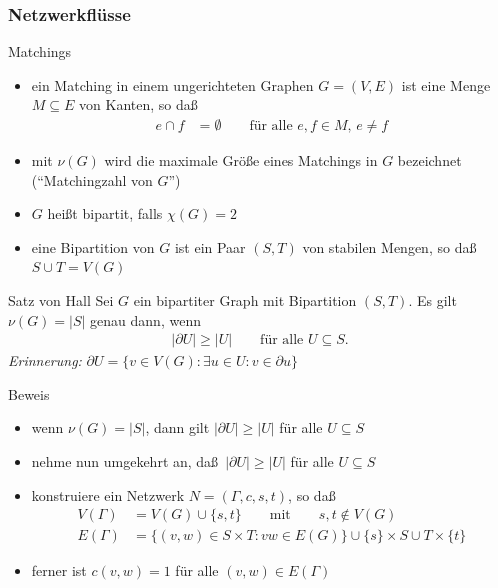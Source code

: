 \documentclass[aspectratio=1610, 11pt]{beamer}
\newcommand{\mytitle}{Netzwerkfl\"usse}
\begin{document}
\begin{frame}\frametitle{\mytitle}
	\begin{overprint}
		\begin{exampleblock}{Matchings}
			\begin{itemize}
				\item ein \alert{Matching} in einem ungerichteten Graphen $G=(V,E)$ ist eine Menge $M\subseteq E$ von Kanten, so da\ss
					\begin{align*}
						e\cap f&=\emptyset\qquad\mbox{f\"ur alle }e,f\in M,\,e\neq f
					\end{align*}
				\item mit $\nu(G)$ wird die maximale Gr\"o\ss e eines Matchings in $G$ bezeichnet (``Matchingzahl von $G$'')
				\item $G$ hei\ss t \alert{bipartit}, falls $\chi(G)=2$
				\item eine \alert{Bipartition} von $G$ ist ein Paar $(S,T)$ von stabilen Mengen, so da\ss\ $S\cup T=V(G)$
			\end{itemize}
		\end{exampleblock}
		\begin{exampleblock}{Satz von Hall}
			Sei $G$ ein bipartiter Graph mit Bipartition $(S,T)$.
			Es gilt $\nu(G)=|S|$ genau dann, wenn
			\begin{align*}
				|\partial U|\geq|U|\qquad\mbox{f\"ur alle }U\subseteq S.
			\end{align*}
			\emph{Erinnerung:} $\partial U=\{v\in V(G):\exists u\in U:v\in\partial u\}$
		\end{exampleblock}
		\begin{exampleblock}{Beweis}
			\begin{itemize}
				\item wenn $\nu(G)=|S|$, dann gilt $|\partial U|\geq|U|$ f\"ur alle $U\subseteq S$
				\item nehme nun umgekehrt an, da\ss\ $|\partial U|\geq|U|$ f\"ur alle $U\subseteq S$
				\item konstruiere ein Netzwerk $N=(\Gamma,c,s,t)$, so da\ss\
					\begin{align*}
						V(\Gamma)&=V(G)\cup\{s,t\}\qquad\mbox{mit}\qquad s,t\not\in V(G)\\
						E(\Gamma)&=\{(v,w)\in S\times T:vw\in E(G)\}\cup\{s\}\times S\cup T\times\{t\}
					\end{align*}
				\item ferner ist $c(v,w)=1$ f\"ur alle $(v,w)\in E(\Gamma)$
			\end{itemize}

\end{exampleblock}
\end{overprint}
\end{frame}
\end{document}
